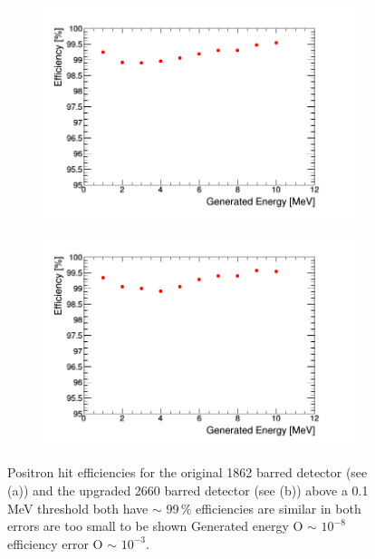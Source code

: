 \begin{figure}[!h]
\centering
\begin{subfigure}{.5\textwidth}
  \centering
  \includegraphics[width=\linewidth]{Chapter4/Figs/Raster/year1Plots/2000_1-10MeV_sec_p_spread_run.png}
  \captionsetup{width=.9\linewidth}
  \caption{}
  \label{subFig:2000_p_sec}
\end{subfigure}%
\begin{subfigure}{.5\textwidth}
  \centering
  \includegraphics[width=\linewidth]{Chapter4/Figs/Raster/year1Plots/3000_1-10MeV_sec_p_spread_run.png}
  \captionsetup{width=.9\linewidth}
  \caption{}
  \label{subFig:3000_p_sec}
\end{subfigure}
\caption{Positron hit efficiencies for the original 1862 barred detector (see (a)) and the upgraded 2660 barred detector (see (b)) above a 0.1\,MeV threshold both have $\sim$ 99\,\% efficiencies are similar in both errors are too small to be shown Generated energy O $\sim$ $10^{-8}$ efficiency error O $\sim$ $10^{-3}$. }
\label{fig:2000_3000_p_secs}
\end{figure}

